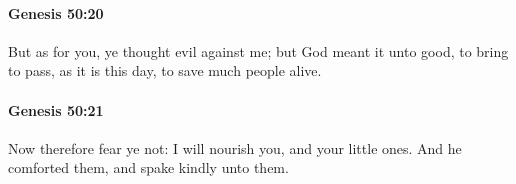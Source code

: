 		\paragraph{Genesis 50:20} %
			\label{GENESIS-50-20}

			But as for you, ye thought evil against me; but God meant it unto good, to bring to pass, as it is this day, to save much people alive.


		\paragraph{Genesis 50:21} %
			\label{GENESIS-50-21}

			Now therefore fear ye not: I will nourish you, and your little ones. And he comforted them, and spake kindly unto them.

